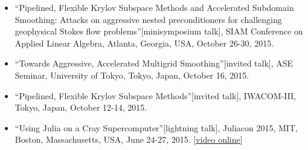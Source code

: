 \begin{itemize}
\begin{tightitemize}
\end{tightitemize}
\item ``Pipelined, Flexible Krylov Subspace Methods and Accelerated Subdomain Smoothing: Attacks on aggressive nested preconditioners for challenging geophysical Stokes flow problems''[minisymposium talk], SIAM Conference on Applied Linear Algebra, Atlanta, Georgia, USA, October 26-30, 2015.
\item ``Towards Aggressive, Accelerated Multigrid Smoothing''[invited talk], ASE Seminar, University of Tokyo, Tokyo, Japan, October 16, 2015.
\item ``Pipelined, Flexible Krylov Subspace Methods''[invited talk], IWACOM-III, Tokyo, Japan, October 12-14, 2015.
\item ``Using Julia on a Cray Supercomputer''[lightning talk], Juliacon 2015, MIT, Boston, Massachusetts, USA, June 24-27, 2015. [\href{https://www.youtube.com/watch?v=NwyKz2KLdtY}{video online}]
\end{itemize}
